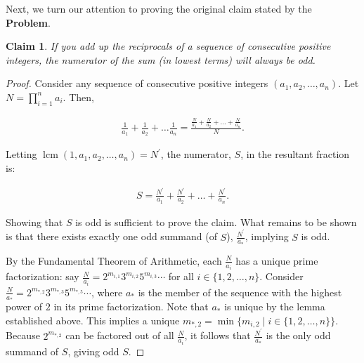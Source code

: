 \documentclass{article}
\newtheorem*{claim}{Claim}
\DeclareMathOperator{\lcm}{lcm}
\begin{document}
Next, we turn our attention to proving the original claim stated by the \textbf{Problem}.

\begin{claim}
  If you add up the reciprocals of a sequence of consecutive positive integers, the numerator of the sum (in lowest terms) will always be odd.
\end{claim}


\begin{proof}

  Consider any sequence of consecutive positive integers $(a_{1}, a_{2}, \ldots, a_{n})$.
  Let $N = \prod_{i=1}^{n} a_{i}$. Then, 

  \begin{align*}
    \frac{1}{a_1} + \frac{1}{a_2} + \ldots \frac{1}{a_n} = \frac{\frac{N}{a_1} + \frac{N}{a_2} + \ldots + \frac{N}{a_n}}{N}.
  \end{align*}

  Letting $\lcm(1, a_{1}, a_{2}, \ldots, a_{n}) = N^{\prime}$, the numerator, $S$, in the resultant fraction is:

  \begin{align*}
    S = \frac{N^{\prime}}{a_1} + \frac{N^{\prime}}{a_2} + \ldots + \frac{N^{\prime}}{a_n}.
  \end{align*}

  Showing that $S$ is odd is sufficient to prove the claim.
  What remains to be shown is that there exists exactly one odd summand (of $S$), $\frac{N^{\prime}}{a_{*}}$, implying $S$ is odd.

  By the Fundamental Theorem of Arithmetic, each $\frac{N}{a_i}$ has a unique prime factorization: say $\frac{N}{a_i} = 2^{m_{i,1}}3^{m_{i,2}}5^{m_{i,3}}\cdots$ for all $i \in \lbrace 1, 2, \ldots, n \rbrace$.  
  Consider $\frac{N}{a_{*}} = 2^{m_{*,2}}3^{m_{*,3}}5^{m_{*,5}}\cdots$, where $a_{*}$ is the member of the sequence with the highest power of $2$ in its prime factorization. Note that $a_{*}$ is unique by the lemma established above.
  This implies a unique $m_{*,2} = \min \lbrace m_{i, 2} \mid i \in \lbrace 1, 2, \ldots, n \rbrace \rbrace$.
  Because $2^{m_{*,2}}$ can be factored out of all $\frac{N}{a_{i}}$, it follows that $\frac{N^{\prime}}{a_{*}}$ is the only odd summand of $S$, giving odd $S$.

\end{proof}
\end{document}
